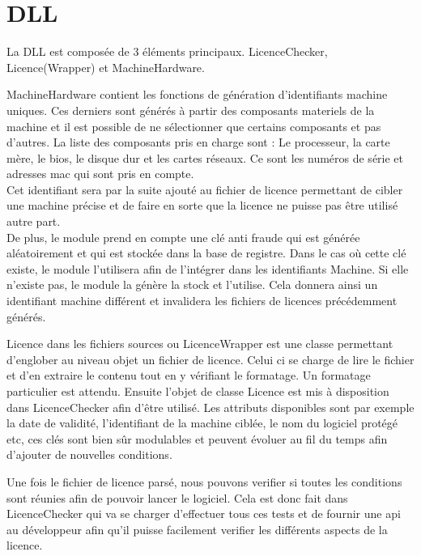 \section{DLL}

La DLL est composée de 3 éléments principaux. LicenceChecker, Licence(Wrapper) 
et MachineHardware.\newline

MachineHardware contient les fonctions de génération d'identifiants machine 
uniques. Ces derniers sont générés à partir des composants materiels de la 
machine et il est possible de ne sélectionner que certains composants et pas 
d'autres. La liste des composants pris en charge sont : Le processeur, 
la carte mère, le bios, le disque dur et les cartes réseaux. Ce sont les numéros
de série et adresses mac qui sont pris en compte.\\ 
Cet identifiant sera par la suite ajouté au fichier de licence permettant de 
cibler une machine précise et de faire en sorte que la licence ne puisse pas 
être utilisé autre part.\\
De plus, le module prend en compte une clé anti fraude qui est générée 
aléatoirement et qui est stockée dans la base de registre. Dans le cas où cette 
clé existe, le module l'utilisera afin de l'intégrer dans les identifiants 
Machine. Si elle n'existe pas, le module la génère la stock et l'utilise. Cela 
donnera ainsi un identifiant machine différent et invalidera les fichiers de 
licences précédemment générés.
\newline

Licence dans les fichiers sources ou LicenceWrapper est une classe permettant 
d'englober au niveau objet un fichier de licence. Celui ci se charge de lire le 
fichier et d'en extraire le contenu tout en y vérifiant le formatage. 
Un formatage particulier est attendu. Ensuite l'objet de classe Licence est mis
à disposition dans LicenceChecker afin d'être utilisé. Les attributs disponibles
sont par exemple la date de validité, l'identifiant de la machine ciblée, le nom
du logiciel protégé etc, ces clés sont bien sûr modulables et peuvent évoluer au 
fil du temps afin d'ajouter de nouvelles conditions.
\newline

Une fois le fichier de licence parsé, nous pouvons verifier si toutes les 
conditions sont réunies afin de pouvoir lancer le logiciel. Cela est donc fait 
dans LicenceChecker qui va se charger d'effectuer tous ces tests et de fournir 
une api au développeur afin qu'il puisse facilement verifier les différents 
aspects de la licence.
\newline

